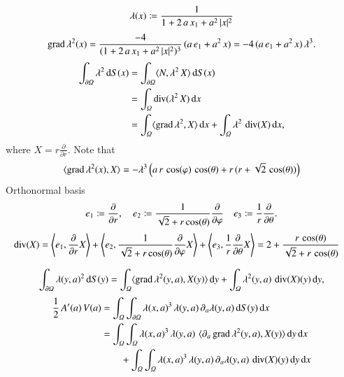 \begin{align*}
	\lambda(x)
	\coloneqq 
	\frac{1}{1+ 2 \, a\, x_1 + a^2 \, \lvert{x}\rvert^2}
\end{align*}
\begin{align*}
	\operatorname{grad} \lambda^2(x)
	=
	\frac{-4}{(1+ 2 \, a\, x_1 + a^2 \, \lvert{x}\rvert^2)^3}
	\,
	(a \, e_1 + a^2 \, x)
	=
	- 4 \, (a \, e_1 + a^2 \, x) \, \lambda^3.
\end{align*}
\begin{align*}
	\int_{\partial \varOmega} \lambda^2 \, {\operatorname{d}} S(x)
	&=
	\int_{\partial \varOmega} \langle N,\lambda^2 \,  X \rangle \, {\operatorname{d}} S(x)	
	\\
	&=
	\int_{\varOmega} \operatorname{div}( \lambda^2 \,  X ) \, {\operatorname{d}} x
	\\
	&=
	\int_{\varOmega}  \langle  \operatorname{grad} \lambda^2 , X  \rangle \, {\operatorname{d}} x	
	+
	\int_{\varOmega} \lambda^2 \,  \operatorname{div}(X ) \, {\operatorname{d}} x,
\end{align*}
where $X = r \frac{\partial}{\partial r}$.
Note that
\begin{align*}
	\langle 	\operatorname{grad} \lambda^2(x) , X \rangle
	= - \lambda^3
	\left(
	a \, r \, \cos(\varphi) \, \cos(\theta)
	+
	r \, (r + \sqrt{2}\, \cos(\theta))
	\right)
\end{align*}
Orthonormal basis
\begin{align*}
	e_1 \coloneqq\frac{\partial}{\partial r},\quad
	e_2 \coloneqq \frac{1}{\sqrt{2} + r \cos(\theta)}\frac{\partial}{\partial \varphi} \quad	
	e_3 \coloneqq\frac{1}{r}\frac{\partial}{\partial \theta}
	.
\end{align*}
\begin{align*}
	\operatorname{div}(X)
	&=
	\left\langle e_1, \frac{\partial}{\partial r} X \right\rangle
	+
	\left\langle e_2 , \frac{1}{\sqrt{2} + r \cos(\theta)} \frac{\partial}{\partial \varphi} X \right\rangle	
	+
	\left\langle e_3 , \frac{1}{r}\frac{\partial}{\partial \theta} X \right\rangle		
	= 
	2
	+
	\frac{r\, \cos(\theta)}{\sqrt{2} + r \, \cos(\theta)}
\end{align*}

\newpage

\begin{align*}
	\int_{\partial \varOmega} \lambda(y,a)^2 \, {\operatorname{d}} S(y)
	=
	\int_{\varOmega}  \langle  \operatorname{grad} \lambda^2 (y,a) , X(y)  \rangle \, {\operatorname{d}} y
	+
	\int_{\varOmega} \lambda^2(y,a) \,  \operatorname{div}(X )(y) \, {\operatorname{d}} y,
\end{align*}
\begin{align*}
	\frac{1}{2}\, A'(a) \, V(a)
	&=
	\int_\varOmega \int_{\partial \varOmega}
		\lambda(x,a)^3 \, \lambda(y,a) \, \partial_a\lambda(y,a)
	 \, {\operatorname{d}} S(y) \, {\operatorname{d}} x
	\\
	&=
	\int_{\varOmega} \int_\varOmega
		\lambda(x,a)^3 \,  \lambda(y,a) \, 
	\, \langle  \partial_a \operatorname{grad} \lambda^2 (y,a) , X(y)  \rangle
	\, {\operatorname{d}} y \, {\operatorname{d}} x
	\\
	&\qquad 
	+
	\int_{\varOmega} \int_\varOmega
		\lambda(x,a)^3 \,  \lambda(y,a) \, \partial_a\lambda(y,a) 
	\,\operatorname{div}(X)(y)
	\, {\operatorname{d}} y \, {\operatorname{d}} x
\end{align*}

